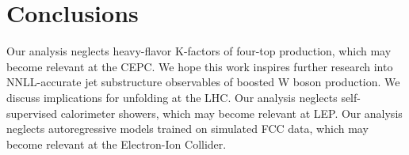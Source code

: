 \section{Conclusions}\label{sec:conclusions}

Our analysis neglects heavy-flavor K-factors of four-top production,
which may become relevant at the CEPC. We hope this work inspires
further research into NNLL-accurate jet substructure observables of
boosted W boson production. We discuss implications for unfolding at the
LHC. Our analysis neglects self-supervised calorimeter showers, which
may become relevant at LEP. Our analysis neglects autoregressive models
trained on simulated FCC data, which may become relevant at the
Electron-Ion Collider.

